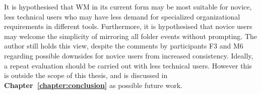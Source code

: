 It is hypothesised that WM in its current form may be most suitable for novice, less technical users who may have less demand for specialized organizational requirements in different tools.  %
Furthermore, it is hypothesised that novice users may welcome the simplicity of mirroring all folder events without prompting.  The author still holds this view, despite the comments by participants F3 and M6 regarding possible downsides for novice users from increased consistency.    Ideally, a repeat evaluation should be carried out with less technical users.  However this is outside the scope of this thesis, and is discussed in \textbf{Chapter~\ref{chapter:conclusion}} as possible future work.













